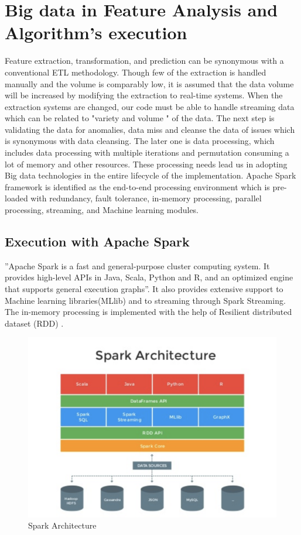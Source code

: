 \documentclass[sigconf]{acmart}
\begin{document}
\section{Big data in Feature Analysis and Algorithm's execution}
Feature extraction, transformation, and prediction can be synonymous with a conventional ETL methodology. Though few of the extraction is handled manually and the volume is comparably low, it is assumed that the data volume will be increased by modifying the extraction to real-time systems. When the extraction systems are changed, our code must be able to handle streaming data which can be related to "variety and volume " of the data. The next step is validating the data for anomalies, data miss and cleanse the data of issues which is synonymous with data cleansing. The later one is data processing, which includes data processing with multiple iterations and permutation consuming a lot of memory and other resources. These processing needs lead us in adopting Big data technologies in the entire lifecycle of the implementation.
Apache Spark framework is identified as the end-to-end processing environment which is pre-loaded with redundancy, fault tolerance, in-memory processing, parallel processing, streaming, and Machine learning modules.

\subsection{Execution with Apache Spark}
''Apache Spark is a fast and general-purpose cluster computing system. It provides high-level APIs in Java, Scala, Python and R, and an optimized engine that supports general execution graphs''. It also provides extensive support to Machine learning libraries(MLlib) and to streaming through Spark Streaming. The in-memory processing is implemented with the help of Resilient distributed dataset (RDD) \cite{5:online}.

\begin{figure}[!ht]
  \centering\includegraphics[width=\columnwidth]{images/Sparkarchic.png}
  \caption{Spark Architecture}
  \label{fig:sparkarchi}
\end{figure}
\end{document}
